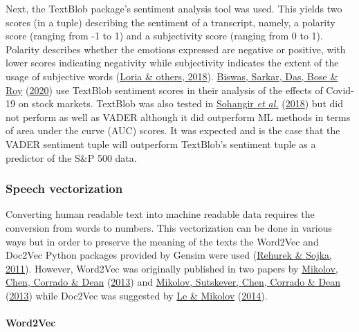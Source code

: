 \documentclass[11pt,preprint, authoryear]{elsarticle}
\numberwithin{equation}{section}
\numberwithin{figure}{section}
\numberwithin{table}{section}
\begin{document}
Next, the TextBlob package's sentiment analysis tool was used. This
yields two scores (in a tuple) describing the sentiment of a transcript,
namely, a polarity score (ranging from -1 to 1) and a subjectivity score
(ranging from 0 to 1). Polarity describes whether the emotions expressed
are negative or positive, with lower scores indicating negativity while
subjectivity indicates the extent of the usage of subjective words
(\protect\hyperlink{ref-loria2018textblob}{Loria \& others, 2018}).
\protect\hyperlink{ref-biswas2020examining}{Biswas, Sarkar, Das, Bose \&
Roy} (\protect\hyperlink{ref-biswas2020examining}{2020}) use TextBlob
sentiment scores in their analysis of the effects of Covid-19 on stock
markets. TextBlob was also tested in
\protect\hyperlink{ref-sohangir2018financial}{Sohangir \emph{et al.}}
(\protect\hyperlink{ref-sohangir2018financial}{2018}) but did not
perform as well as VADER although it did outperform ML methods in terms
of area under the curve (AUC) scores. It was expected and is the case
that the VADER sentiment tuple will outperform TextBlob's sentiment
tuple as a predictor of the S\&P 500 data.

\hypertarget{speech-vectorization}{%
\subsubsection{Speech vectorization}\label{speech-vectorization}}

Converting human readable text into machine readable data requires the
conversion from words to numbers. This vectorization can be done in
various ways but in order to preserve the meaning of the texts the
Word2Vec and Doc2Vec Python packages provided by Gensim were used
(\protect\hyperlink{ref-rehurek2011gensim}{Rehurek \& Sojka, 2011}).
However, Word2Vec was originally published in two papers by
\protect\hyperlink{ref-mikolov2013efficient}{Mikolov, Chen, Corrado \&
Dean} (\protect\hyperlink{ref-mikolov2013efficient}{2013}) and
\protect\hyperlink{ref-mikolov2013distributed}{Mikolov, Sutskever, Chen,
Corrado \& Dean} (\protect\hyperlink{ref-mikolov2013distributed}{2013})
while Doc2Vec was suggested by
\protect\hyperlink{ref-le2014distributed}{Le \& Mikolov}
(\protect\hyperlink{ref-le2014distributed}{2014}).

\hypertarget{word2vec}{%
\paragraph{Word2Vec}\label{word2vec}}
\end{document}

